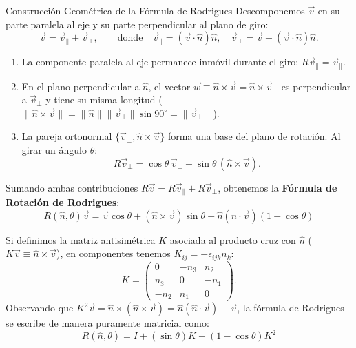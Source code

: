 \documentclass[11pt,letterpaper]{article}
\begin{document}
\begin{theorembox}{Construcción Geométrica de la Fórmula de Rodrigues}
Descomponemos $\vec{v}$ en su parte paralela al eje y su parte perpendicular al plano de giro:
\[
\vec{v} = \vec{v}_\parallel + \vec{v}_\perp, \qquad \text{donde} \quad \vec{v}_\parallel = (\vec{v}\cdot\hat{n})\hat{n}, \quad \vec{v}_\perp = \vec{v} - (\vec{v}\cdot\hat{n})\hat{n}.
\]
\begin{enumerate}
    \item La componente paralela al eje permanece inmóvil durante el giro: $R\vec{v}_\parallel = \vec{v}_\parallel$.
    \item En el plano perpendicular a $\hat{n}$, el vector $\vec{w} \equiv \hat{n} \times \vec{v} = \hat{n} \times \vec{v}_\perp$ es perpendicular a $\vec{v}_\perp$ y tiene su misma longitud ($\|\hat{n}\times\vec{v}\| = \|\hat{n}\|\|\vec{v}_\perp\|\sin 90^\circ = \|\vec{v}_\perp\|$).
    \item La pareja ortonormal $\{\vec{v}_\perp, \hat{n}\times\vec{v}\}$ forma una base del plano de rotación. Al girar un ángulo $\theta$:
    \[
    R\vec{v}_\perp = \cos\theta\,\vec{v}_\perp + \sin\theta\,(\hat{n} \times \vec{v}).
    \]
\end{enumerate}
Sumando ambas contribuciones $R\vec{v} = R\vec{v}_\parallel + R\vec{v}_\perp$, obtenemos la \textbf{Fórmula de Rotación de Rodrigues}:
\[
\boxed{R(\hat{n}, \theta)\vec{v} = \vec{v}\cos\theta + (\hat{n} \times \vec{v})\sin\theta + \hat{n}(\hat{n} \cdot \vec{v})(1 - \cos\theta)}
\]
\end{theorembox}

Si definimos la matriz antisimétrica $K$ asociada al producto cruz con $\hat{n}$ ($K\vec{v} \equiv \hat{n} \times \vec{v}$), en componentes tenemos $K_{ij} = -\epsilon_{ijk} n_k$:
\[
K = \begin{pmatrix} 0 & -n_3 & n_2 \\ n_3 & 0 & -n_1 \\ -n_2 & n_1 & 0 \end{pmatrix}.
\]
Observando que $K^2 \vec{v} = \hat{n} \times (\hat{n} \times \vec{v}) = \hat{n}(\hat{n}\cdot\vec{v}) - \vec{v}$, la fórmula de Rodrigues se escribe de manera puramente matricial como:
\[
\boxed{R(\hat{n}, \theta) = I + (\sin\theta) K + (1 - \cos\theta) K^2}
\]

\end{document}

